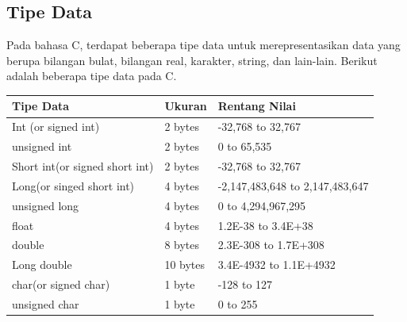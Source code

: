 \subsection{Tipe Data}
Pada bahasa C, terdapat beberapa tipe data untuk merepresentasikan data yang berupa bilangan bulat, bilangan real, karakter, string, dan lain-lain. Berikut adalah beberapa tipe data pada C.
\begin{center}
	\begin{tabular}{|l|l|l|}
		\hline
		Tipe Data                       & Ukuran   & Rentang Nilai                              \\ \hline
		Int (or signed int)            & 2 bytes  & -32,768 to 32,767                          \\ \hline
		unsigned int                   & 2 bytes  & 0 to 65,535                                \\ \hline
		Short int(or signed short int) & 2 bytes  & -32,768 to 32,767                          \\ \hline
		Long(or singed short int)      & 4 bytes  & -2,147,483,648 to 2,147,483,647            \\ \hline
		unsigned long                  & 4 bytes  & 0 to 4,294,967,295                         \\ \hline
		float                          & 4 bytes  & 1.2E-38 to 3.4E+38     						\\ \hline
		double                         & 8 bytes  & 2.3E-308 to 1.7E+308    					\\ \hline
		Long double                    & 10 bytes & 3.4E-4932 to 1.1E+4932 						 \\ \hline
		char(or signed char)           & 1 byte   & -128 to 127                                \\ \hline
		unsigned char                  & 1 byte   & 0 to 255                             \\ \hline
	\end{tabular}
\end{center}
